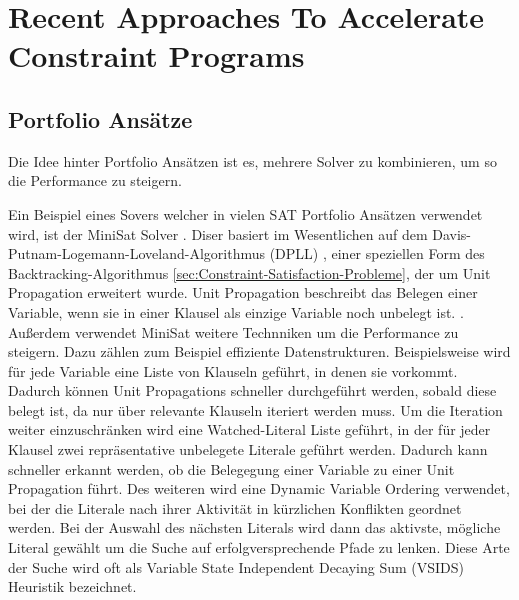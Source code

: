 \section{Recent Approaches To Accelerate Constraint Programs}
\label{sec:Recent-Approaches-To-Accelerate-Constraint-Programs}


\subsection{Portfolio Ansätze}
\label{sec:Portfolio-Ansätze}

Die Idee hinter Portfolio Ansätzen ist es, mehrere Solver zu kombinieren, um so
die Performance zu steigern. 


Ein Beispiel eines Sovers welcher in vielen SAT Portfolio Ansätzen verwendet
wird, ist der MiniSat Solver \cite*{een04bo}. Diser basiert im Wesentlichen auf
dem Davis-Putnam-Logemann-Loveland-Algorithmus (DPLL) \cite*{davis62jo}, einer
speziellen Form des Backtracking-Algorithmus
\ref{sec:Constraint-Satisfaction-Probleme}, der um Unit Propagation erweitert
wurde. Unit Propagation beschreibt das Belegen einer Variable, wenn sie in einer
Klausel als einzige Variable noch unbelegt ist. \cite*[S.89]{rossi06bo}.
Außerdem verwendet MiniSat weitere Technniken um die Performance zu steigern.
Dazu zählen zum Beispiel effiziente Datenstrukturen. Beispielsweise wird für
jede Variable eine Liste von Klauseln geführt, in denen sie vorkommt. Dadurch
können Unit Propagations schneller durchgeführt werden, sobald diese belegt ist,
da nur über relevante Klauseln iteriert werden muss. Um die Iteration weiter
einzuschränken wird eine Watched-Literal Liste geführt, in der für jeder Klausel
zwei repräsentative unbelegete Literale geführt werden. Dadurch kann schneller
erkannt werden, ob die Belegegung einer Variable zu einer Unit Propagation
führt. \cite[505]{een04bo} Des weiteren wird eine Dynamic Variable Ordering
verwendet, bei der die Literale nach ihrer Aktivität in kürzlichen Konflikten
geordnet werden. Bei der Auswahl des nächsten Literals wird dann das aktivste,
mögliche Literal gewählt um die Suche auf erfolgversprechende Pfade zu lenken.
Diese Arte der Suche wird oft als Variable State Independent Decaying Sum
(VSIDS) Heuristik bezeichnet. \cite[506f]{een04bo}



